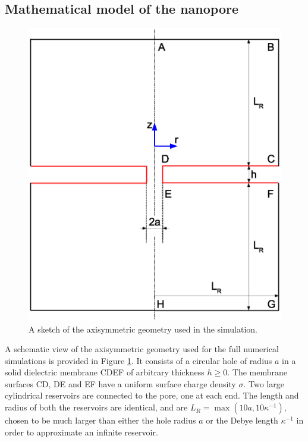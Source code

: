\subsection{Mathematical model of the nanopore}\label{sec:math_model}
\begin{figure}[ht]
\centering
\includegraphics[width=1.0\textwidth]{zero_thickness/figure4.eps}
\caption{A sketch of the axisymmetric geometry used in the simulation.}
\label{fig:system}
\end{figure}
A schematic view of the axisymmetric geometry used for the full numerical
simulations is provided in Figure \ref{fig:system}. It consists of a circular hole of radius $a$ in a solid dielectric membrane CDEF of arbitrary thickness $h\ge 0$. The membrane surfaces CD, DE and EF have a uniform surface charge density $\sigma$. Two large cylindrical reservoirs are connected to the pore, one at each end. The length and radius of both the reservoirs are identical, and are
$L_R=\max(10a, 10\kappa^{-1})$, chosen to be much larger than either the hole radius $a$ or the Debye length $\kappa^{-1}$  in order to approximate an infinite reservoir. 


